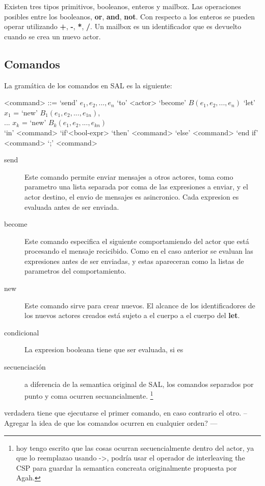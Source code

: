 \documentclass[fleqn]{article}
\begin{document}
Existen tres tipos primitivos, booleanos, enteros y mailbox. Las operaciones
posibles entre los booleanos, \textbf{or}, \textbf{and}, \textbf{not}. Con
respecto a los enteros se pueden operar utilizando \textbf{+}, \textbf{-},
\textbf{*}, \textbf{/}. Un mailbox es un identificador que es devuelto cuando se
crea un nuevo actor.

\subsection{Comandos}
La gramática de los comandos en SAL es la siguiente:

\begin{grammar}
  <command> ::= `send' $e_1, e_2, ..., e_n$ `to' <actor>  
  \alt `become' $B(e_1, e_2, ..., e_n)$
  \alt `let' $x_1$ = `new' $B_1(e_1, e_2, ..., e_{1n})$, \\
  ... $x_k$ = `new' $B_k(e_1, e_2, ..., e_{kn})$        \\
  `in' <command> 
  \alt`if`<bool-expr> `then' <command> `else' <command> `end if' 
  \alt<command> `;' <command>
\end{grammar}

\begin{description}
\item [send]  Este comando permite enviar mensajes a otros actores, toma como
  parametro una lista separada por coma de las expresiones a enviar, y el actor
  destino, el envio de mensajes es asincronico. Cada expresion es evaluada antes
  de ser enviada.
\item [become] Este comando especifica el siguiente comportamiendo del actor
  que está procesando el mensaje recicibido. Como en el caso anterior se evaluan
  las expresiones antes de ser enviadas, y estas apareceran como la listas de
  parametros del comportamiento. 
\item[new] Este comando sirve para crear nuevos. El alcance de los
  identificadores de los nuevos actores creados está sujeto a el cuerpo a
  el cuerpo del \textbf{let}.
\item[condicional] La expresion booleana tiene que ser evaluada, si es
\item[secuenciación] a diferencia de la semantica original de SAL, los
  comandos separados por punto y coma ocurren secuancialmente. \footnote{hoy
    tengo escrito que las cosas ocurran secuencialmente dentro del actor, ya que
  lo reemplazao usando ->, podría usar el operador de interleaving the CSP para
  guardar la semantica concreata originalmente propuesta por Agah.}
\end{description}
  verdadera tiene que ejecutarse el primer comando, en caso contrario el otro.
-- Agregar la idea de que los comandos ocurren en cualquier orden? ---
\end{document}
